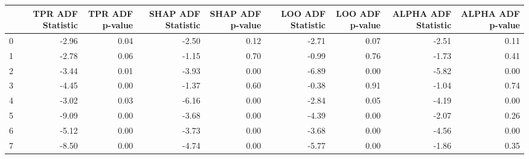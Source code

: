 \begin{tabular}{lrrrrrrrr}
\toprule
 & TPR ADF Statistic & TPR ADF p-value & SHAP ADF Statistic & SHAP ADF p-value & LOO ADF Statistic & LOO ADF p-value & ALPHA ADF Statistic & ALPHA ADF p-value \\
\midrule
0 & -2.96 & 0.04 & -2.50 & 0.12 & -2.71 & 0.07 & -2.51 & 0.11 \\
1 & -2.78 & 0.06 & -1.15 & 0.70 & -0.99 & 0.76 & -1.73 & 0.41 \\
2 & -3.44 & 0.01 & -3.93 & 0.00 & -6.89 & 0.00 & -5.82 & 0.00 \\
3 & -4.45 & 0.00 & -1.37 & 0.60 & -0.38 & 0.91 & -1.04 & 0.74 \\
4 & -3.02 & 0.03 & -6.16 & 0.00 & -2.84 & 0.05 & -4.19 & 0.00 \\
5 & -9.09 & 0.00 & -3.68 & 0.00 & -4.39 & 0.00 & -2.07 & 0.26 \\
6 & -5.12 & 0.00 & -3.73 & 0.00 & -3.68 & 0.00 & -4.56 & 0.00 \\
7 & -8.50 & 0.00 & -4.74 & 0.00 & -5.77 & 0.00 & -1.86 & 0.35 \\
\bottomrule
\end{tabular}
